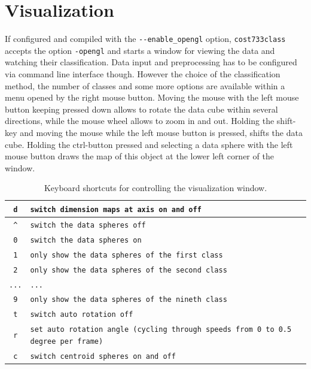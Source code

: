\documentclass[12pt, oneside, a4paper, headsepline, plainheadsepline]{scrbook}
\begin{document}
\chapter{Visualization}
If configured and compiled with the \verb+--enable_opengl+ option, \verb+cost733class+ accepts the option \verb+-opengl+ and starts 
a window for viewing the data and watching their classification. Data input and preprocessing has to be configured via
command line interface though. However the choice of the classification method, the number of classes and some more options
are available within a menu opened by the right mouse button.
Moving the mouse with the left mouse button keeping pressed down allows to rotate the data cube within several directions, 
while the mouse wheel allows to zoom in and out.
Holding the shift-key and moving the mouse while the left mouse button is pressed, shifts the data cube.
Holding the ctrl-button pressed and selecting a data sphere with the left mouse button draws the map of this object at the lower left corner of the window.


\begin{table}
\label{shortcuts} 
\begin{scriptsize}
\begin{tabular}{|c|l|}
\hline   \verb+d+   & \verb+switch dimension maps at axis on and off+ \\ 
\hline   \verb+^+   & \verb+switch the data spheres off+ \\ 
\hline   \verb+0+   & \verb+switch the data spheres on+ \\ 
\hline   \verb+1+   & \verb+only show the data spheres of the first class+ \\ 
\hline   \verb+2+   & \verb+only show the data spheres of the second class+ \\ 
\hline   \verb+...+   & \verb+...+ \\ 
\hline   \verb+9+   & \verb+only show the data spheres of the nineth class+ \\ 
\hline   \verb+t+   & \verb+switch auto rotation off+ \\ 
\hline   \verb+r+   & \verb+set auto rotation angle (cycling through speeds from 0 to 0.5 degree per frame)+ \\ 
\hline   \verb+c+   & \verb+switch centroid spheres on and off+ \\ 
\hline
\end{tabular} 
\end{scriptsize}
\caption{Keyboard shortcuts for controlling the visualization window.}
\end{table}
\end{document}
